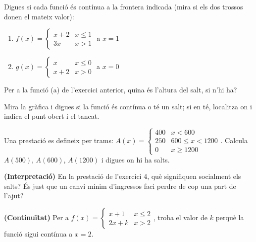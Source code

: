 \begin{exercicis}
\begin{exlist}
  \item Digues si cada funció és contínua a la frontera indicada (mira si els dos
        trossos donen el mateix valor):
        \begin{enumerate}[label=\alph*), leftmargin=1.6em, topsep=2pt]
          \item $f(x)=\begin{cases}x+2 & x\le 1\\ 3x & x>1\end{cases}$ a $x=1$
          \item $g(x)=\begin{cases}x & x\le 0\\ x+2 & x>0\end{cases}$ a $x=0$
        \end{enumerate}
  \item Per a la funció (a) de l'exercici anterior, quina és l'altura del salt, si n'hi
        ha?
  \item Mira la gràfica i digues si la funció és contínua o té un salt; si en té,
        localitza on i indica el punt obert i el tancat.

        \begin{center}
        \end{center}

  \item Una prestació es defineix per trams:
        $A(x)=\begin{cases}400 & x<600\\ 250 & 600\le x<1200\\ 0 & x\ge 1200\end{cases}$.
        Calcula $A(500)$, $A(600)$, $A(1200)$ i digues on hi ha salts.
  \item \textbf{(Interpretació)} En la prestació de l'exercici 4, què signifiquen
        socialment els salts? És just que un canvi mínim d'ingressos faci perdre de cop
        una part de l'ajut?
  \item \textbf{(Continuïtat)} Per a $f(x)=\begin{cases}x+1 & x\le 2\\ 2x+k & x>2\end{cases}$,
        troba el valor de $k$ perquè la funció sigui contínua a $x=2$.
\end{exlist}
\end{exercicis}

